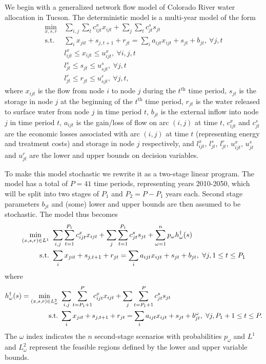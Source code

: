 \documentclass[11pt]{article}
\newcommand{\st}{\mbox{s.t.}}
\begin{document}
We begin with a generalized network flow model of Colorado River water allocation in Tucson.  The deterministic model is a multi-year model of the form
\begin{align*}
	\min_{x,s,r} \ & \sum_{i,j} \sum_t c_{ijt}^x x_{ijt} + \sum_{j} \sum_{t} c_{jt}^s s_{jt}\\
	\st \ & \sum_i x_{jit} + s_{j,t+1} + r_{jt} = \sum_i a_{ijt} x_{ijt} + s_{jt} + b_{jt}, \ \forall j,t \\
	& l_{ijt}^x \leq x_{ijt} \leq u_{ijt}^x, \ \forall i,j,t \\
	& l_{jt}^s \leq s_{jt} \leq u_{sjt}^s, \ \forall j,t \\
	& l_{jt}^r \leq r_{jt} \leq u_{sjt}^r, \ \forall j,t,
\end{align*}
where $x_{ijt}$ is the flow from node $i$ to node $j$ during the $t^{\text{th}}$ time period, $s_{jt}$ is the storage in node $j$ at the beginning of the $t^{\text{th}}$ time period, $r_{jt}$ is the water released to surface water from node $j$ in time period $t$, $b_{jt}$ is the external inflow into node $j$ in time period $t$, $a_{ijt}$ is the gain/loss of flow on arc $(i,j)$ at time $t$, $c_{ijt}^x$ and $c_{jt}^s$ are the economic losses associated with arc $(i,j)$ at time $t$ (representing energy and treatment costs) and storage in node $j$ respectively, and $l_{ijt}^x$, $l_{jt}^s$, $l_{jt}^r$, $u_{ijt}^x$, $u_{jt}^s$ and $u_{jt}^r$ are the lower and upper bounds on decision variables.

To make this model stochastic we rewrite it as a two-stage linear program.  The model has a total of $P = 41$ time periods, representing years 2010-2050, which will be split into two stages of $P_1$ and $P_2 = P - P_1$ years each.  Second stage parameters $b_{jt}$ and (some) lower and upper bounds are then assumed to be stochastic.  The model thus becomes
\begin{align}
	\min_{(x,s,r) \in L^1} \ & \sum_{i,j} \sum_{t=1}^{P_1} c_{ijt}^x x_{ijt} + \sum_{j} \sum_{t=1}^{P_1} c_{jt}^s s_{jt} + \sum_{\omega=1}^n p_\omega h^\dagger_\omega(s) \label{eq:gen_network_two_stage} \\
	\st \ & \sum_i x_{jit} + s_{j,t+1} + r_{jt} = \sum_i a_{ijt} x_{ijt} + s_{jt} + b_{jt}, \ \forall j, 1 \leq t \leq P_1 \notag
\end{align}
where
\begin{align}
	h^\dagger_\omega(s) = \min_{(x,s,r) \in L^2_\omega} \ & \sum_{i,j} \sum_{t=P_1+1}^{P} c_{ijt}^x x_{ijt} + \sum_{j} \sum_{t=P_1+1}^{P} c_{jt}^s s_{jt} \label{eq:gen_network_second_stage} \\
	\st \ & \sum_i x_{jit} + s_{j,t+1} + r_{jt} = \sum_i a_{ijt} x_{ijt} + s_{jt} + b_{jt}^\omega, \ \forall j, P_1+1 \leq t \leq P. \notag
\end{align}
The $\omega$ index indicates the $n$ second-stage scenarios with probabilities $p_\omega$ and $L^1$ and $L^2_\omega$ represent the feasible regions defined by the lower and upper variable bounds.
\end{document}
